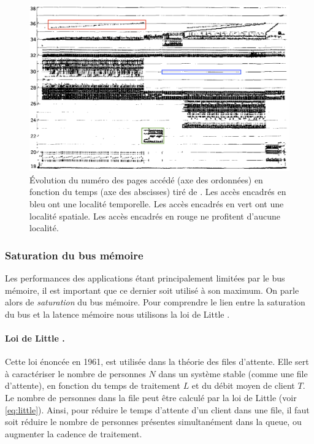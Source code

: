         
        \begin{figure}
            \center
            \includegraphics[width=14cm]{images/cpu_locality.png}
            \caption{ Évolution du numéro des pages accédé (axe des ordonnées) en fonction du temps (axe des abscisses) tiré de \cite{Hatfield:1971}. Les accès encadrés en bleu ont une localité temporelle. Les accès encadrés en vert ont une localité spatiale. Les accès encadrés en rouge ne profitent d'aucune localité. 
            \label{pic_cpu_locality}}
        \end{figure}

    
    \subsubsection{Saturation du bus mémoire}
    
        Les performances des applications étant principalement limitées par le bus mémoire, il est important que ce dernier soit utilisé à son maximum. On parle alors de \textit{saturation} du bus mémoire. Pour comprendre le lien entre la saturation du bus et la latence mémoire nous utilisons la loi de Little .
        
        \paragraph{Loi de Little \cite{Little_1961}.} \label{sec:loidelittle} Cette loi énoncée en 1961, est utilisée dans la théorie des files d'attente. Elle sert à caractériser le nombre de personnes $N$ dans un système stable (comme une file d'attente), en fonction du temps de traitement $L$ et du débit moyen de client $T$. Le nombre de personnes dans la file peut être calculé par la loi de Little (voir \autoref{eq:little}). Ainsi, pour réduire le temps d'attente d'un client dans une file, il faut soit réduire le nombre de personnes présentes simultanément dans la queue, ou augmenter la cadence de traitement.
        
